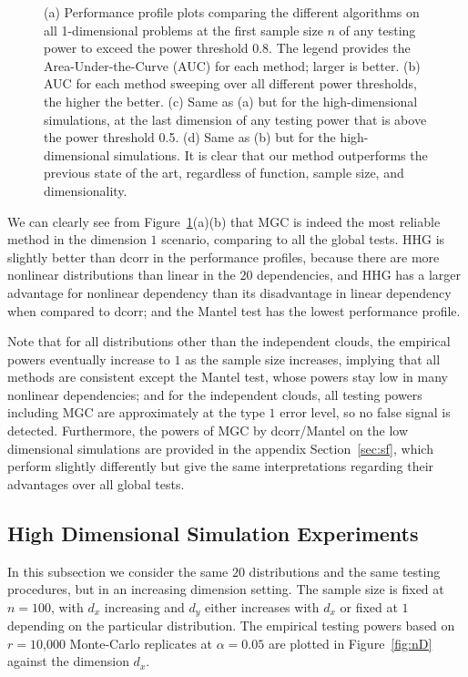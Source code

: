 \documentclass[11pt]{article}
\begin{document}
\begin{figure}[htbp]
{(a) Performance profile plots comparing the different algorithms on all 1-dimensional problems at the first sample size $n$ of any testing power to exceed the power threshold 0.8. The legend provides the Area-Under-the-Curve (AUC) for each method; larger is better.
(b) AUC for each method sweeping over all different power thresholds, the higher the better.
(c) Same as (a) but for the high-dimensional simulations, at the last dimension of any testing power that is above the power threshold 0.5.
(d) Same as (b) but for the high-dimensional simulations.
It is clear that our method outperforms the previous state of the art, regardless of function, sample size, and dimensionality.}
\label{fig:pp}
\end{figure}

We can clearly see from Figure~\ref{fig:pp}(a)(b) that MGC is indeed the most reliable method in the dimension $1$ scenario, comparing to all the global tests. HHG is slightly better than dcorr in the performance profiles, because there are more nonlinear distributions than linear in the $20$ dependencies, and HHG has a larger advantage for nonlinear dependency than its disadvantage in linear dependency when compared to dcorr; and the Mantel test has the lowest performance profile. 

Note that for all distributions other than the independent clouds, the empirical powers eventually increase to $1$ as the sample size increases, implying that all methods are consistent except the Mantel test, whose powers stay low in many nonlinear dependencies; and for the independent clouds, all testing powers including MGC are approximately at the type $1$ error level, so no false signal is detected. Furthermore, the powers of MGC by dcorr/Mantel on the low dimensional simulations are provided in the appendix Section~\ref{sec:sf}, which perform slightly differently but give the same interpretations regarding their advantages over all global tests.


\subsection{High Dimensional Simulation Experiments}
\label{numer2}
In this subsection we consider the same $20$ distributions and the same testing procedures, but in an increasing dimension setting. The sample size is fixed at $n=100$, with $d_{x}$ increasing and $d_{y}$ either increases with $d_{x}$ or fixed at $1$ depending on the particular distribution. The empirical testing powers based on $r=10$,$000$ Monte-Carlo replicates at $\alpha=0.05$ are plotted in Figure~\ref{fig:nD} against the dimension $d_{x}$.
\end{document}
